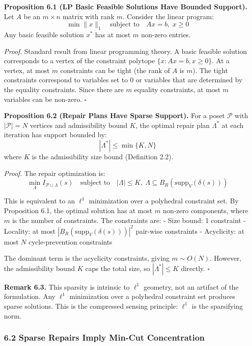 \documentclass[
]{article}
\begin{document}
\textbf{Proposition 6.1 (LP Basic Feasible Solutions Have Bounded
Support).} Let \(A\) be an \(m \times n\) matrix with rank \(m\).
Consider the linear program:
\[\min \|x\|_1 \quad \text{subject to} \quad Ax = b, \; x \geq 0\] Any
basic feasible solution \(x^*\) has at most \(m\) non-zero entries.

\emph{Proof.} Standard result from linear programming theory. A basic
feasible solution corresponds to a vertex of the constraint polytope
\(\{x : Ax = b, x \geq 0\}\). At a vertex, at most \(m\) constraints can
be tight (the rank of \(A\) is \(m\)). The tight constraints correspond
to variables set to 0 or variables that are determined by the equality
constraints. Since there are \(m\) equality constraints, at most \(m\)
variables can be non-zero. \(\square\)

\textbf{Proposition 6.2 (Repair Plans Have Sparse Support).} For a poset
\(\mathcal{P}\) with \(|\mathcal{P}| = N\) vertices and admissibility
bound \(K\), the optimal repair plan \(\Lambda^*\) at each iteration has
support bounded by: \[|\Lambda^*| \leq \min\{K, N\}\] where \(K\) is the
admissibility size bound (Definition 2.2).

\emph{Proof.} The repair optimization is:
\[\min_{\Lambda} I_{\mathcal{P} \cup \Lambda}(s) \quad \text{subject to} \quad |\Lambda| \leq K, \; \Lambda \subseteq B_R(\mathrm{supp}_V(\delta(s)))\]

This is equivalent to an \(\ell^1\) minimization over a polyhedral
constraint set. By Proposition 6.1, the optimal solution has at most
\(m\) non-zero components, where \(m\) is the number of constraints. The
constraints are: - Size bound: 1 constraint - Locality: at most
\(|B_R(\mathrm{supp}_V(\delta(s)))|^2\) pair-wise constraints -
Acyclicity: at most \(N\) cycle-prevention constraints

The dominant term is the acyclicity constraints, giving \(m \sim O(N)\).
However, the admissibility bound \(K\) caps the total size, so
\(|\Lambda^*| \leq K\) directly. \(\square\)

\textbf{Remark 6.3.} This sparsity is intrinsic to \(\ell^1\) geometry,
not an artifact of the formulation. Any \(\ell^1\) minimization over a
polyhedral constraint set produces sparse solutions. This is the
compressed sensing principle: \(\ell^1\) is the sparsifying norm.

\subsubsection{6.2 Sparse Repairs Imply Min-Cut
Concentration}\label{sparse-repairs-imply-min-cut-concentration}
\end{document}
